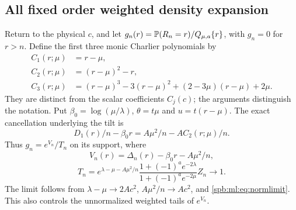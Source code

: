 \subsection{All fixed order weighted density expansion}
Return to the physical $c$, and let $g_n(r)=\mathbb P(R_n=r)/Q_{\mu,a}\{r\}$, with $g_n=0$ for $r>n$. Define the first three monic Charlier polynomials by
\begin{align}
 C_1(r;\mu)&=r-\mu,\nonumber\\
 C_2(r;\mu)&=(r-\mu)^2-r,\label{spb:ml:eq:charlier}\\
 C_3(r;\mu)&=(r-\mu)^3-3(r-\mu)^2+(2-3\mu)(r-\mu)+2\mu.\nonumber
\end{align}
They are distinct from the scalar coefficients $C_j(c)$; the arguments distinguish the notation.
Put $\beta_0=\log(\mu/\lambda)$, $\theta=t\mu$ and $u=t(r-\mu)$. The exact cancellation underlying the tilt is
\begin{equation}\label{spb:ml:eq:tiltcancel}
 D_1(r)/n-\beta_0r=A\mu^2/n-A C_2(r;\mu)/n.
\end{equation}
Thus $g_n=e^{V_n}/T_n$ on its support, where
\[
 V_n(r)=\Delta_n(r)-\beta_0r-A\mu^2/n,
\]
\begin{equation}\label{spb:ml:eq:Tn}
 T_n=e^{\lambda-\mu-A\mu^2/n}
 \frac{1+(-1)^ae^{-2\lambda}}{1+(-1)^ae^{-2\mu}}Z_n\longrightarrow1.
\end{equation}
The limit follows from $\lambda-\mu\to2Ac^2$, $A\mu^2/n\to Ac^2$, and \eqref{spb:ml:eq:normlimit}. This also controls the unnormalized weighted tails of $e^{V_n}$.

